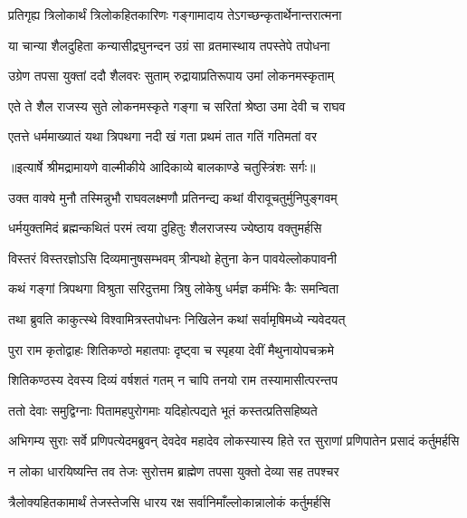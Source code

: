 \twolineshloka
{प्रतिगृह्य त्रिलोकार्थं त्रिलोकहितकारिणः}
{गङ्गामादाय तेऽगच्छन्कृतार्थेनान्तरात्मना} %

\twolineshloka
{या चान्या शैलदुहिता कन्यासीद्रघुनन्दन}
{उग्रं सा व्रतमास्थाय तपस्तेपे तपोधना} %

\twolineshloka
{उग्रेण तपसा युक्तां ददौ शैलवरः सुताम्}
{रुद्रायाप्रतिरूपाय उमां लोकनमस्कृताम्} %

\twolineshloka
{एते ते शैल राजस्य सुते लोकनमस्कृते}
{गङ्गा च सरितां श्रेष्ठा उमा देवी च राघव} %

\twolineshloka
{एतत्ते धर्ममाख्यातं यथा त्रिपथगा नदी}
{खं गता प्रथमं तात गतिं गतिमतां वर} %


{॥इत्यार्षे श्रीमद्रामायणे वाल्मीकीये आदिकाव्ये बालकाण्डे चतुस्त्रिंशः सर्गः॥}


\twolineshloka
{उक्त वाक्ये मुनौ तस्मिन्नुभौ राघवलक्ष्मणौ}
{प्रतिनन्द्य कथां वीरावूचतुर्मुनिपुङ्गवम्} %

\twolineshloka
{धर्मयुक्तमिदं ब्रह्मन्कथितं परमं त्वया}
{दुहितुः शैलराजस्य ज्येष्ठाय वक्तुमर्हसि} %

\twolineshloka
{विस्तरं विस्तरज्ञोऽसि दिव्यमानुषसम्भवम्}
{त्रीन्पथो हेतुना केन पावयेल्लोकपावनी} %

\twolineshloka
{कथं गङ्गां त्रिपथगा विश्रुता सरिदुत्तमा}
{त्रिषु लोकेषु धर्मज्ञ कर्मभिः कैः समन्विता} %

\twolineshloka
{तथा ब्रुवति काकुत्स्थे विश्वामित्रस्तपोधनः}
{निखिलेन कथां सर्वामृषिमध्ये न्यवेदयत्} %

\twolineshloka
{पुरा राम कृतोद्वाहः शितिकण्ठो महातपाः}
{दृष्ट्वा च स्पृहया देवीं मैथुनायोपचक्रमे} %

\twolineshloka
{शितिकण्ठस्य देवस्य दिव्यं वर्षशतं गतम्}
{न चापि तनयो राम तस्यामासीत्परन्तप} %

\twolineshloka
{ततो देवाः समुद्विग्नाः पितामहपुरोगमाः}
{यदिहोत्पद्यते भूतं कस्तत्प्रतिसहिष्यते} %

\threelineshloka
{अभिगम्य सुराः सर्वे प्रणिपत्येदमब्रुवन्}
{देवदेव महादेव लोकस्यास्य हिते रत}
{सुराणां प्रणिपातेन प्रसादं कर्तुमर्हसि} %

\twolineshloka
{न लोका धारयिष्यन्ति तव तेजः सुरोत्तम}
{ब्राह्मेण तपसा युक्तो देव्या सह तपश्चर} %

\twolineshloka
{त्रैलोक्यहितकामार्थं तेजस्तेजसि धारय}
{रक्ष सर्वानिमाँल्लोकान्नालोकं कर्तुमर्हसि} %

